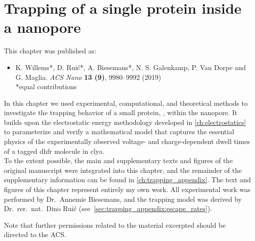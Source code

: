 \chapter{Trapping of a single protein inside a nanopore}
%
\label{ch:trapping}
%
%
%
%

%
%
\begin{shaded}
This chapter was published as:
%
\begin{itemize}
  \item K. Willems*, D. Rui\'{c}*, A. Biesemans*, N. S. Galenkamp, P. Van Dorpe and G. Maglia.
        \textit{ACS Nano} \textbf{13 (9)}, 9980--9992 (2019) %
        \\
        *equal contributions
\end{itemize}
% 
\newpage
\end{shaded}
%
%

%

In this chapter we used experimental, computational, and theoretical methods to investigate the trapping
behavior of a small protein, , within the  nanopore. It builds upon the
electrostatic energy methodology developed in \cref{ch:electrostatics} to parameterize and verify a
mathematical model that captures the essential physics of the experimentally observed voltage- and
charge-dependent dwell times of a tagged \gls{dhfr} molecule in \gls{clya}. \\
%

%
To the extent possible, the main and supplementary texts and figures of the original manuscript were
integrated into this chapter, and the remainder of the supplementary information can be found in
\cref{ch:trapping_appendix}. The text and figures of this chapter represent entirely my own work. All
experimental work was performed by Dr.~Annemie Biesemans, and the trapping model was derived by
Dr.~rer.~nat.~Dino Rui\'{c} (see~\cref{sec:trapping_appendix:escape_rates}).
%

%
%

%
Note that further permissions related to the material excerpted should be directed to the ACS.
%
%
%



